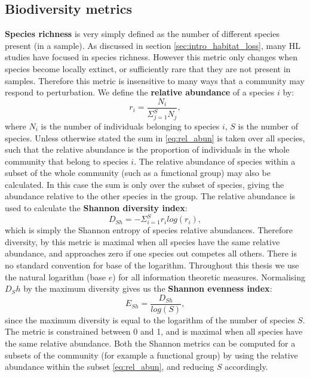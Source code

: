 

\subsection{Biodiversity metrics}
\label{sec:define_dviersity}

\textbf{Species richness} is very simply defined as the number of different species present (in a sample). As discussed in section \ref{sec:intro_habitat_loss}, many HL studies have focused in species richness. However this metric only changes when species become locally extinct, or sufficiently rare that they are not present in samples. Therefore this metric is insensitive to many ways that a community may respond to perturbation. We define the \textbf{relative abundance} of a species $i$ by:
\begin{equation}
r_i = \frac{N_i}{\Sigma_{j=1}^S N_j},
\label{eq:rel_abun}
\end{equation}
%
where $N_i$ is the number of individuals belonging to species $i$, $S$ is the number of species. Unless otherwise stated the sum in \eqref{eq:rel_abun} is taken over all species, such that the relative abundance is the proportion of individuals in the whole community that belong to species $i$. The relative abundance of species within a subset of the whole community (such as a functional group) may also be calculated. In this case the sum is only over the subset of species, giving the abundance relative to the other species in the group. The relative abundance is used to calculate the \textbf{Shannon diversity index}:
\begin{equation}
D_{Sh} = -\Sigma_{i=1}^S r_i log( r_i),
\label{eq:shan_div}
\end{equation}
%
which is simply the Shannon entropy of species relative abundances. Therefore diversity, by this metric is maximal when all species have the same relative abundance, and approaches zero if one species out competes all others. There is no standard convention for base of the logarithm. Throughout this thesis we use the natural logarithm (base $e$) for all information theoretic measures. Normalising $D_Sh$ by the maximum diversity gives us the \textbf{Shannon evenness index}:
\begin{equation}
E_{Sh} = \frac{D_{Sh}}{log(S)},
\label{eq:shan_eq}
\end{equation}
%
since the maximum diversity is equal to the logarithm of the number of species $S$. The metric is constrained between 0 and 1, and is maximal when all species have the same relative abundance. Both the Shannon metrics can be computed for a subsets of the community (for example a functional group) by using the relative abundance within the subset \eqref{eq:rel_abun}, and reducing $S$ accordingly. 

